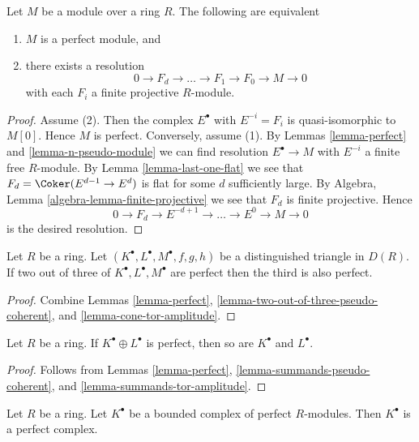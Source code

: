 \begin{lemma}
\label{lemma-perfect-module}
Let $M$ be a module over a ring $R$. The following are equivalent
\begin{enumerate}
\item $M$ is a perfect module, and
\item there exists a resolution
$$
0 \to F_d \to \ldots \to F_1 \to F_0 \to M \to 0
$$
with each $F_i$ a finite projective $R$-module.
\end{enumerate}
\end{lemma}

\begin{proof}
Assume (2). Then the complex $E^\bullet$ with $E^{-i} = F_i$
is quasi-isomorphic to $M[0]$. Hence $M$ is perfect.
Conversely, assume (1). By
Lemmas \ref{lemma-perfect} and \ref{lemma-n-pseudo-module}
we can find resolution $E^\bullet \to M$ with $E^{-i}$ a finite free
$R$-module. By
Lemma \ref{lemma-last-one-flat}
we see that $F_d = \Coker(E^{d - 1} \to E^d)$ is flat for
some $d$ sufficiently large. By
Algebra, Lemma \ref{algebra-lemma-finite-projective}
we see that $F_d$ is finite projective.
Hence
$$
0 \to F_d \to E^{-d+1} \to \ldots \to E^0 \to M \to 0
$$
is the desired resolution.
\end{proof}

\begin{lemma}
\label{lemma-two-out-of-three-perfect}
Let $R$ be a ring. Let $(K^\bullet, L^\bullet, M^\bullet, f, g, h)$
be a distinguished triangle in $D(R)$. If two out of three of
$K^\bullet, L^\bullet, M^\bullet$ are
perfect then the third is also perfect.
\end{lemma}

\begin{proof}
Combine
Lemmas \ref{lemma-perfect}, \ref{lemma-two-out-of-three-pseudo-coherent}, and
\ref{lemma-cone-tor-amplitude}.
\end{proof}

\begin{lemma}
\label{lemma-summands-perfect}
Let $R$ be a ring. If $K^\bullet \oplus L^\bullet$ is perfect, then
so are $K^\bullet$ and $L^\bullet$.
\end{lemma}

\begin{proof}
Follows from
Lemmas \ref{lemma-perfect}, \ref{lemma-summands-pseudo-coherent}, and
\ref{lemma-summands-tor-amplitude}.
\end{proof}

\begin{lemma}
\label{lemma-complex-perfect-modules}
Let $R$ be a ring. Let $K^\bullet$ be a bounded complex of perfect
$R$-modules. Then $K^\bullet$ is a perfect complex.
\end{lemma}

